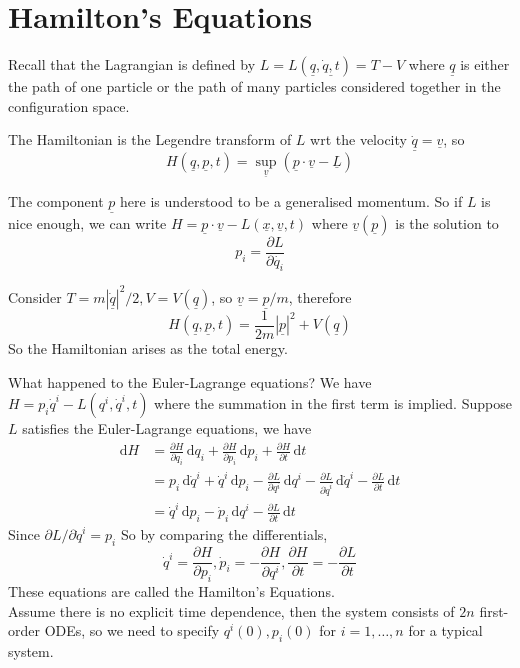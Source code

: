 \section{Hamilton's Equations}
Recall that the Lagrangian is defined by $L=L(\underline{q},\underline{\dot{q},t})=T-V$ where $\underline{q}$ is either the path of one particle or the path of many particles considered together in the configuration space.
\begin{definition}
    The Hamiltonian is the Legendre transform of $L$ wrt the velocity $\underline{\dot{q}}=\underline{v}$, so
    $$H(\underline{q},\underline{p},t)=\sup_{\underline{v}}(\underline{p}\cdot\underline{v}-\underline{L})$$
\end{definition}
The component $\underline{p}$ here is understood to be a generalised momentum.
So if $L$ is nice enough, we can write $H=\underline{p}\cdot\underline{v}-L(\underline{x},\underline{v},t)$ where $\underline{v}(\underline{p})$ is the solution to
$$p_i=\frac{\partial L}{\partial \dot{q_i}}$$
\begin{example}
    Consider $T=m|\underline{\dot{q}}|^2/2, V=V(\underline{q})$, so $\underline{v}=\underline{p}/m$, therefore
    $$H(\underline{q},\underline{p},t)=\frac{1}{2m}|\underline{p}|^2+V(\underline{q})$$
    So the Hamiltonian arises as the total energy.
\end{example}
What happened to the Euler-Lagrange equations?
We have $H=p_i\dot{q}^i-L(q^i,\dot{q}^i,t)$ where the summation in the first term is implied.
Suppose $L$ satisfies the Euler-Lagrange equations, we have
\begin{align*}
    \mathrm dH&=\frac{\partial H}{\partial q_i}\,\mathrm dq_i+\frac{\partial H}{\partial p_i}\,\mathrm dp_i+\frac{\partial H}{\partial t}\,\mathrm dt\\
    &=p_i\,\mathrm d\dot{q}^i+\dot{q}^i\,\mathrm dp_i-\frac{\partial L}{\partial q^i}\,\mathrm dq^i-\frac{\partial L}{\partial \dot{q}^i}\,\mathrm d\dot{q}^i-\frac{\partial L}{\partial t}\,\mathrm dt\\
    &=\dot{q}^i\,\mathrm dp_i-\dot{p}_i\,\mathrm dq^i-\frac{\partial L}{\partial t}\,\mathrm dt
\end{align*}
Since $\partial L/\partial \dot{q}^i=p_i$
So by comparing the differentials,
$$\dot{q}^i=\frac{\partial H}{\partial p_i},\dot{p}_i=-\frac{\partial H}{\partial q^i},\frac{\partial H}{\partial t}=-\frac{\partial L}{\partial t}$$
These equations are called the Hamilton's Equations.\\
Assume there is no explicit time dependence, then the system consists of $2n$ first-order ODEs, so we need to specify $q^i(0),p_i(0)$ for $i=1,\ldots,n$ for a typical system.
